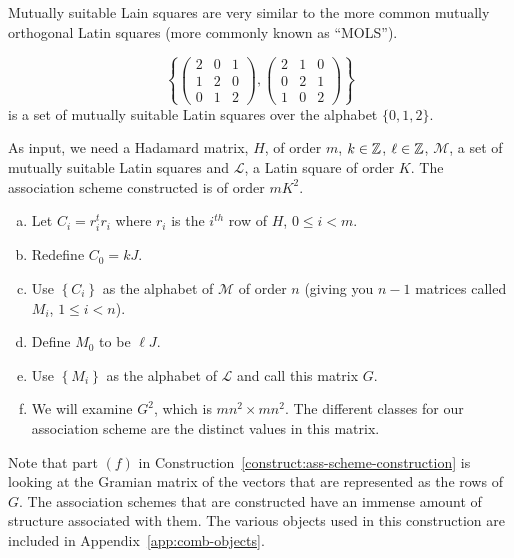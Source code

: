 Mutually suitable Lain squares are very similar to the more common mutually orthogonal Latin squares (more commonly known as ``MOLS'').

\begin{example}\label{ex:msls}
 $$\left\{
   \left(\begin{array}{ccc}
2 & 0 & 1 \\
1 & 2 & 0 \\
0 & 1 & 2
   \end{array}\right),
   \left(\begin{array}{ccc}
2 & 1 & 0 \\
0 & 2 & 1 \\
1 & 0 & 2
   \end{array}\right)
  \right\}$$ is a set of mutually suitable Latin squares over the alphabet $\{0,1,2\}$.
\end{example}



\begin{construction} \label{construct:ass-scheme-construction}
 As input, we need a Hadamard matrix, $H$, of order $m$, $k \in \mathbb{Z}$, $\ell \in \mathbb{Z}$, $\mathcal{M}$, a set of mutually suitable Latin squares and $\mathcal{L}$, a Latin square of order $K$. The association scheme constructed is of order $mK^2$.

  \begin{enumerate}[(a)]
   \item Let $C_i = r^t_ir_i$ where $r_i$ is the $i^{th}$ row of $H$, $0 \leq i < m$.
   \item Redefine $C_0 = kJ$.
   \item Use $\left\{C_i\right\}$ as the alphabet of $\mathcal{M}$ of order $n$ (giving you $n-1$ matrices called $M_i$, $1 \leq i < n$).
   \item Define $M_0$ to be $\ell J$.
   \item Use $\left\{M_i\right\}$ as the alphabet of $\mathcal{L}$ and call this matrix $G$.
   \item We will examine $G^2$, which is $mn^2 \times mn^2$. The different classes for our association scheme are the distinct values in this matrix.
  \end{enumerate}

\end{construction}

Note that part $(f)$ in Construction~\ref{construct:ass-scheme-construction} is looking at the Gramian matrix of the vectors that are represented as the rows of $G$. The association schemes that are constructed have an immense amount of structure associated with them. The various objects used in this construction are included in Appendix~\ref{app:comb-objects}.

